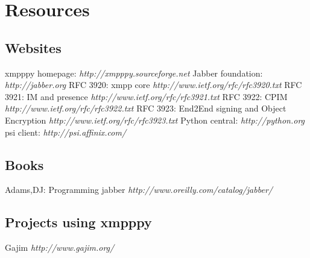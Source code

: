 \chapter{Resources}


\section{Websites}
xmpppy homepage:		\textit{http://xmpppy.sourceforge.net}
\newline
Jabber foundation:		\textit{http://jabber.org}
\newline
\newline
RFC 3920: xmpp core		\textit{http://www.ietf.org/rfc/rfc3920.txt}
\newline
RFC 3921: IM and presence	\textit{http://www.ietf.org/rfc/rfc3921.txt}
\newline
RFC 3922: CPIM			\textit{http://www.ietf.org/rfc/rfc3922.txt}
\newline
RFC 3923: End2End signing and Object Encryption	\textit{http://www.ietf.org/rfc/rfc3923.txt}
\newline
\newline
Python central:			\textit{http://python.org}
\newline
psi client:			\textit{http://psi.affinix.com/}

\section{Books}
Adams,DJ: Programming jabber	\textit{http://www.oreilly.com/catalog/jabber/}

\section{Projects using xmpppy}
Gajim			\textit{http://www.gajim.org/}
